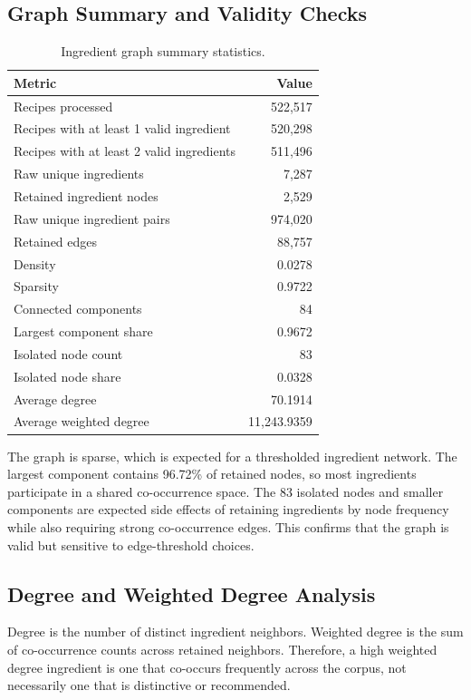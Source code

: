 \documentclass[11pt,a4paper]{article}
\begin{document}
\subsection{Graph Summary and Validity Checks}

\begin{table}[H]
\centering
\small
\begin{tabular}{lr}
\toprule
\textbf{Metric} & \textbf{Value} \\
\midrule
Recipes processed & 522,517 \\
Recipes with at least 1 valid ingredient & 520,298 \\
Recipes with at least 2 valid ingredients & 511,496 \\
Raw unique ingredients & 7,287 \\
Retained ingredient nodes & 2,529 \\
Raw unique ingredient pairs & 974,020 \\
Retained edges & 88,757 \\
Density & 0.0278 \\
Sparsity & 0.9722 \\
Connected components & 84 \\
Largest component share & 0.9672 \\
Isolated node count & 83 \\
Isolated node share & 0.0328 \\
Average degree & 70.1914 \\
Average weighted degree & 11,243.9359 \\
\bottomrule
\end{tabular}
\caption{Ingredient graph summary statistics.}
\label{tab:ingredient_graph_summary}
\end{table}

The graph is sparse, which is expected for a thresholded ingredient network. The largest component contains 96.72\% of retained nodes, so most ingredients participate in a shared co-occurrence space. The 83 isolated nodes and smaller components are expected side effects of retaining ingredients by node frequency while also requiring strong co-occurrence edges. This confirms that the graph is valid but sensitive to edge-threshold choices.

\subsection{Degree and Weighted Degree Analysis}
Degree is the number of distinct ingredient neighbors. Weighted degree is the sum of co-occurrence counts across retained neighbors. Therefore, a high weighted degree ingredient is one that co-occurs frequently across the corpus, not necessarily one that is distinctive or recommended.
\end{document}

